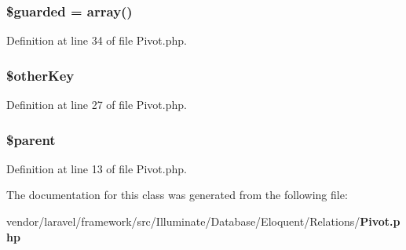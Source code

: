 \subsubsection[{\$guarded}]{\setlength{\rightskip}{0pt plus 5cm}\$guarded = array()\hspace{0.3cm}{\ttfamily [protected]}}\label{class_illuminate_1_1_database_1_1_eloquent_1_1_relations_1_1_pivot_a5758640ec23bdc1a6850649763244e86}


Definition at line 34 of file Pivot.\+php.

\subsubsection[{\$other\+Key}]{\setlength{\rightskip}{0pt plus 5cm}\$other\+Key\hspace{0.3cm}{\ttfamily [protected]}}\label{class_illuminate_1_1_database_1_1_eloquent_1_1_relations_1_1_pivot_aab553fc108eda149e05970ab095128d8}


Definition at line 27 of file Pivot.\+php.

\subsubsection[{\$parent}]{\setlength{\rightskip}{0pt plus 5cm}\$parent\hspace{0.3cm}{\ttfamily [protected]}}\label{class_illuminate_1_1_database_1_1_eloquent_1_1_relations_1_1_pivot_a4e2313a4b35b72a06ac45fd38960f677}


Definition at line 13 of file Pivot.\+php.



The documentation for this class was generated from the following file\+:\begin{DoxyCompactItemize}
\item 
vendor/laravel/framework/src/\+Illuminate/\+Database/\+Eloquent/\+Relations/{\bf Pivot.\+php}\end{DoxyCompactItemize}
